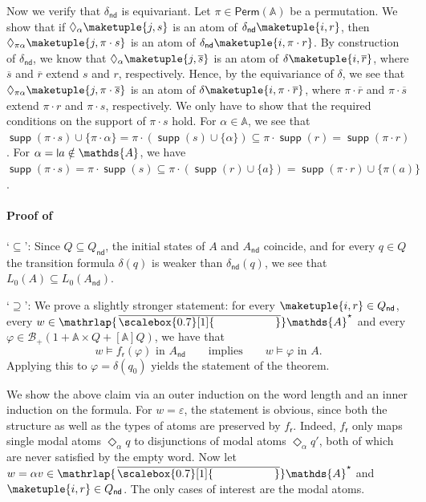 \documentclass[10pt,a4paper]{amsart}
\theoremstyle{definition}
\newcommand{\seq}{\subseteq}
\newcommand{\qes}{\supseteq}
\newcommand{\At}{\mathds{A}}
\newcommand{\barAs}{\barNames^{\star}}
\newcommand{\op}[1]{\operatorname{\mathsf{#1}}}
\newcommand{\nd}{\op{nd}}
\newcommand{\allbool}{\mathcal{B}}
\DeclareMathOperator{\supp}{\mathsf{supp}}
\newcommand{\Perm}{\mathsf{Perm}}
\newcommand{\names}{\At}
\newcommand{\Abstr}[2][\names]{[#1]#2}
\renewcommand{\phi}{\varphi}
\newcommand{\set}[1]{\{#1\}}
\newcommand{\mybar}[3]{%
  \mathrlap{\hspace{#2}\overline{\scalebox{#1}[1]{\phantom{\ensuremath{#3}}}}}\ensuremath{#3}
}
\newcommand{\barNames}{{\mybar{0.7}{1.25pt}{\names}}}
\renewcommand{\vDash}{\models}
\newcommand{\midmid}{\hspace{0.2ex}{\rule[-0.1ex]{0.6pt}{1.65ex}}\hspace{0.2ex}}
\newcommand{\newletter}[1]{{\midmid}#1}
\renewcommand{\enquote}[1]{`#1'}
\begin{document}
\begin{IEEEproof}
  Now we verify that $\delta_{\nd}$ is equivariant. Let $\pi \in \Perm(\names)$ be a permutation.
  We show that if $\Diamond_\alpha \maketuple{j,s}$ is an atom of $\delta_{\nd}\maketuple{i,r}$, then
  $\Diamond_{\pi\alpha} \maketuple{j,\pi\cdot s}$ is an atom of $\delta_{\nd}\maketuple{i,\pi\cdot r}$.
  By construction of $\delta_{\nd}$, we know that $\Diamond_\alpha \maketuple{j,\overline{s}}$ is an atom of
  $\delta\maketuple{i, \overline{r}}$, where $\overline{s}$ and $\overline{r}$ extend $s$ and $r$, respectively.
  Hence, by the equivariance of $\delta$, we see that $\Diamond_{\pi\alpha} \maketuple{j, \pi\cdot\overline{s}}$ is an atom of $\delta\maketuple{i, \pi\cdot\overline{r}}$, where $\pi\cdot\overline{r}$ and $\pi\cdot\overline{s}$ extend $\pi\cdot r$
  and $\pi\cdot s$, respectively. We only have to show that the required conditions on the support of $\pi\cdot s$ hold.
  For $\alpha \in \names$, we see that $\supp(\pi\cdot s) \cup \set{\pi\cdot \alpha} = \pi \cdot (\supp(s) \cup \set{\alpha})
  \seq \pi \cdot \supp(r) = \supp(\pi\cdot r)$. For $\alpha=\newletter a \notin \names$, we have $\supp(\pi\cdot s) = \pi \cdot \supp(s) \seq
  \pi \cdot (\supp(r) \cup \set{a}) = \supp(\pi\cdot r) \cup \set{\pi(a)}$.
\end{IEEEproof}


\paragraph*{Proof of~}
  \enquote{$\seq$}: Since $Q \seq Q_{\nd}$, the initial states of $A$ and $A_{\nd}$ coincide,
    and for every $q \in Q$ the transition formula $\delta(q)$ is weaker than $\delta_{\nd}(q)$,
    we see that $L_0(A) \seq L_0(A_{\nd})$.

  \enquote{$\qes$}: We prove a slightly stronger statement: for every $\maketuple{i, r}
    \in Q_{\nd}$, every  $w \in \barAs$ and every $\phi\in \allbool_+(1 + \names \times Q + \Abstr{Q})$, we have that
\[ w \vDash f_{\mathsf{r}}(\varphi) \text{ in $A_{\nd}$} \qquad\text{implies}\qquad w \vDash \varphi \text{ in $A$}.\]
Applying this to $\phi=\delta(q_0)$ yields the statement of the theorem.

 We show the above claim via an outer induction on the word length and an inner induction on the formula.
    For $w = \varepsilon$, the statement is obvious, since both the structure as well as the types of atoms are preserved by $f_{\mathsf{r}}$.
    Indeed, $f_{\mathsf{r}}$ only maps single modal atoms $\Diamond_\alpha q$ to  disjunctions of modal atoms $\Diamond_\alpha q'$, both of which are never satisfied by the empty word.
    Now let $w = \alpha v \in \barAs$ and $\maketuple{i, r} \in Q_{\nd}$.
    The only cases of interest are the modal atoms.
\end{document}
